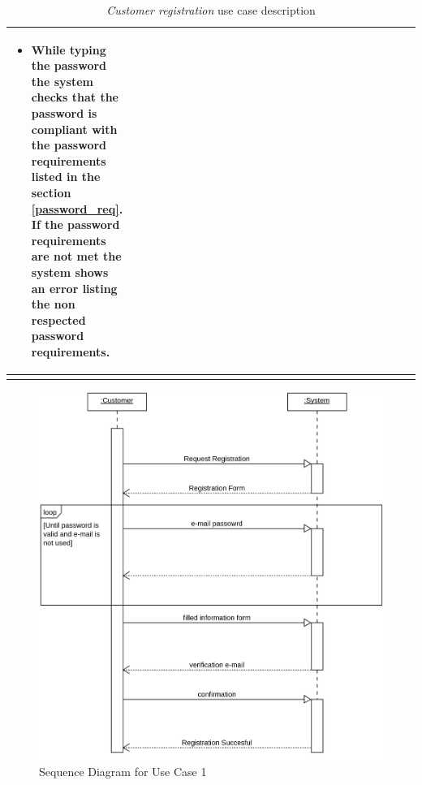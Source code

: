 \begin{longtable}{p{0.25\linewidth}p{0.75\linewidth}}
\begin{itemize}
        \item While typing the password the system checks that the password is compliant with the password requirements listed in the section \ref{password_req}. If the password requirements are not met the system shows an error listing the non respected password requirements.
    \end{itemize}                                                                                                                                     \\
    \bottomrule
    \caption{\emph{Customer registration} use case description}
\end{longtable}

\begin{figure}[H]
    \includegraphics[width=\textwidth]{Images/UML_Seq_Diag_1.png}
    \caption{\label{fig:Use_Case_Diag}Sequence Diagram for Use Case 1}
\end{figure}

